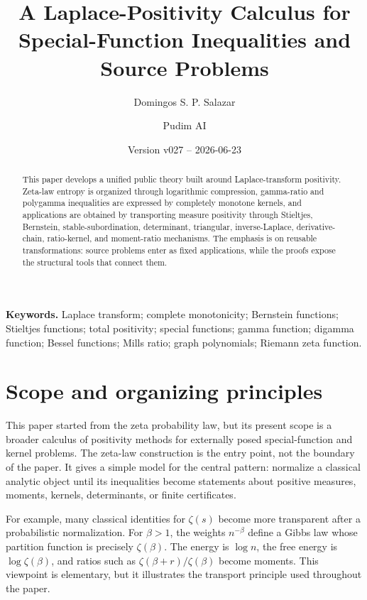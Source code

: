 \documentclass[11pt]{article}
\title{A Laplace-Positivity Calculus for Special-Function Inequalities and Source Problems}
\author{Domingos S. P. Salazar \and Pudim AI}
\date{Version v027 -- 2026-06-23}
\numberwithin{equation}{section}
\theoremstyle{definition}
\theoremstyle{remark}
\newcommand{\1}{\mathbf 1}
\begin{document}
\maketitle

\begin{abstract}
This paper develops a unified public theory built around Laplace-transform
positivity.  Zeta-law entropy is organized through logarithmic compression,
gamma-ratio and polygamma inequalities are expressed by completely monotone
kernels, and applications are obtained by transporting measure positivity
through Stieltjes, Bernstein, stable-subordination, determinant, triangular,
inverse-Laplace, derivative-chain, ratio-kernel, and moment-ratio mechanisms.
The emphasis is on reusable transformations: source problems enter as fixed
applications, while the proofs expose the structural tools that connect them.
\end{abstract}

\tableofcontents

\medskip



\noindent\textbf{Keywords.} Laplace transform; complete monotonicity; Bernstein functions; Stieltjes functions; total positivity; special functions; gamma function; digamma function; Bessel functions; Mills ratio; graph polynomials; Riemann zeta function.

\section{Scope and organizing principles}

This paper started from the zeta probability law, but its present scope is a
broader calculus of positivity methods for externally posed special-function
and kernel problems.  The zeta-law construction is the entry point, not the
boundary of the paper.  It gives a simple model for the central pattern:
normalize a classical analytic object until its inequalities become statements
about positive measures, moments, kernels, determinants, or finite
certificates.

For example, many classical identities for \(\zeta(s)\) become more
transparent after a probabilistic normalization.  For \(\beta>1\), the weights
\(n^{-\beta}\) define a Gibbs law whose partition function is precisely
\(\zeta(\beta)\).  The energy is \(\log n\), the free energy is
\(\log\zeta(\beta)\), and ratios such as
\(\zeta(\beta+r)/\zeta(\beta)\) become moments.  This viewpoint is elementary,
but it illustrates the transport principle used throughout the paper.
\end{document}
